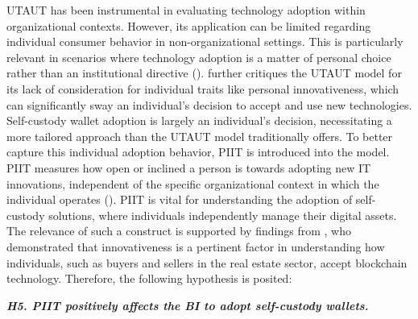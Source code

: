 \documentclass[twocolumn]{article}
\begin{document}
UTAUT has been instrumental in evaluating technology adoption within organizational contexts. However, its application can be limited regarding individual consumer behavior in non-organizational settings. This is particularly relevant in scenarios where technology adoption is a matter of personal choice rather than an institutional directive (\cite{venkatesh_consumer_2012}). \textcite{dwivedi_re-examining_2019} further critiques the UTAUT model for its lack of consideration for individual traits like personal innovativeness, which can significantly sway an individual's decision to accept and use new technologies.
\\Self-custody wallet adoption is largely an individual's decision, necessitating a more tailored approach than the UTAUT model traditionally offers. To better capture this individual adoption behavior, PIIT is introduced into the model. PIIT measures how open or inclined a person is towards adopting new IT innovations, independent of the specific organizational context in which the individual operates (\cite{agarwal_conceptual_1998}). PIIT is vital for understanding the adoption of self-custody solutions, where individuals independently manage their digital assets. The relevance of such a construct is supported by findings from \textcite{ng_factors_2021}, who demonstrated that innovativeness is a pertinent factor in understanding how individuals, such as buyers and sellers in the real estate sector, accept blockchain technology. Therefore, the following hypothesis is posited:

\textbf{\textit{H5. PIIT positively affects the BI to adopt self-custody wallets.
}}
\end{document}
